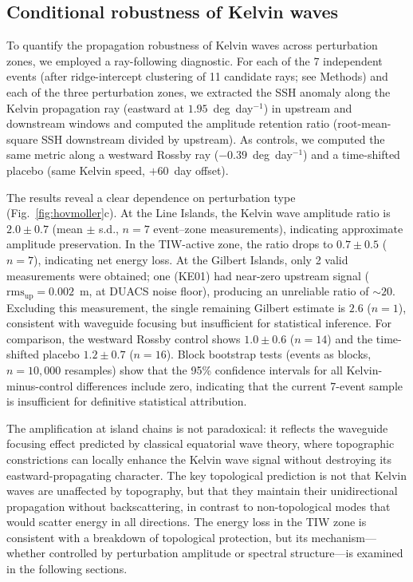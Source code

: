 \documentclass[11pt]{article}
\begin{document}
\subsection{Conditional robustness of Kelvin waves}

To quantify the propagation robustness of Kelvin waves across perturbation zones, we employed a ray-following diagnostic. For each of the 7 independent events (after ridge-intercept clustering of 11 candidate rays; see Methods) and each of the three perturbation zones, we extracted the SSH anomaly along the Kelvin propagation ray (eastward at $1.95$~deg~day$^{-1}$) in upstream and downstream windows and computed the amplitude retention ratio (root-mean-square SSH downstream divided by upstream). As controls, we computed the same metric along a westward Rossby ray ($-0.39$~deg~day$^{-1}$) and a time-shifted placebo (same Kelvin speed, $+60$~day offset).

The results reveal a clear dependence on perturbation type (Fig.~\ref{fig:hovmoller}c). At the Line Islands, the Kelvin wave amplitude ratio is $2.0 \pm 0.7$ (mean $\pm$ s.d., $n = 7$ event--zone measurements), indicating approximate amplitude preservation. In the TIW-active zone, the ratio drops to $0.7 \pm 0.5$ ($n = 7$), indicating net energy loss. At the Gilbert Islands, only 2 valid measurements were obtained; one (KE01) had near-zero upstream signal ($\mathrm{rms}_\mathrm{up} = 0.002$~m, at DUACS noise floor), producing an unreliable ratio of ${\sim}20$. Excluding this measurement, the single remaining Gilbert estimate is $2.6$ ($n = 1$), consistent with waveguide focusing but insufficient for statistical inference. For comparison, the westward Rossby control shows $1.0 \pm 0.6$ ($n = 14$) and the time-shifted placebo $1.2 \pm 0.7$ ($n = 16$). Block bootstrap tests (events as blocks, $n = 10{,}000$ resamples) show that the 95\% confidence intervals for all Kelvin-minus-control differences include zero, indicating that the current 7-event sample is insufficient for definitive statistical attribution.

The amplification at island chains is not paradoxical: it reflects the waveguide focusing effect predicted by classical equatorial wave theory, where topographic constrictions can locally enhance the Kelvin wave signal without destroying its eastward-propagating character\cite{McPhaden1987}. The key topological prediction is not that Kelvin waves are unaffected by topography, but that they maintain their unidirectional propagation without backscattering, in contrast to non-topological modes that would scatter energy in all directions. The energy loss in the TIW zone is consistent with a breakdown of topological protection, but its mechanism---whether controlled by perturbation amplitude or spectral structure---is examined in the following sections.
\end{document}
